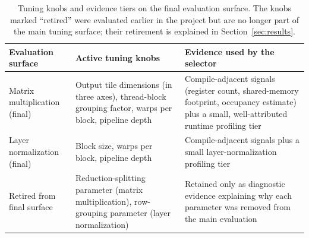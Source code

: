 \begin{table}[t]
\centering
\small
\begin{tabular}{p{}p{}p{}}
\toprule
Evaluation surface & Active tuning knobs & Evidence used by the selector \\
\midrule
Matrix multiplication (final) & Output tile dimensions (in three axes), thread-block grouping factor, warps per block, pipeline depth & Compile-adjacent signals (register count, shared-memory footprint, occupancy estimate) plus a small, well-attributed runtime profiling tier \\
Layer normalization (final) & Block size, warps per block, pipeline depth & Compile-adjacent signals plus a small layer-normalization profiling tier \\
Retired from final surface & Reduction-splitting parameter (matrix multiplication), row-grouping parameter (layer normalization) & Retained only as diagnostic evidence explaining why each parameter was removed from the main evaluation \\
\bottomrule
\end{tabular}
\caption{Tuning knobs and evidence tiers on the final evaluation surface. The knobs marked ``retired'' were evaluated earlier in the project but are no longer part of the main tuning surface; their retirement is explained in Section~\ref{sec:results}.}
\label{tab:knobs}
\end{table}
